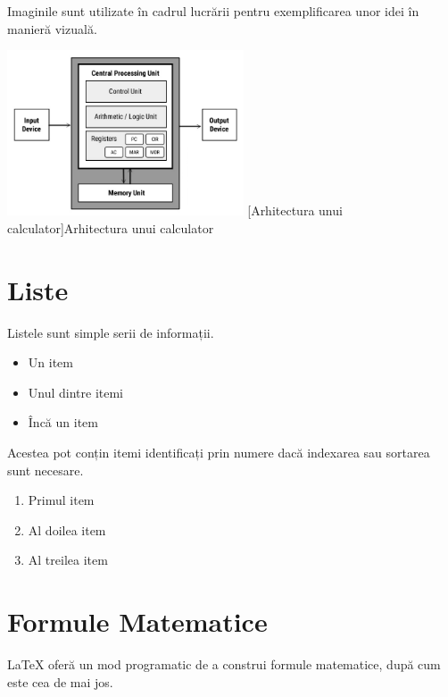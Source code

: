 \documentclass[../../main.tex]{subfiles}
\begin{document}
Imaginile sunt utilizate în cadrul lucrării pentru exemplificarea unor idei în manieră vizuală.

\begin{center}
    \includegraphics[width=7cm]{components/images/architecture.jpg}
    \label{fig:architecture}
    \captionsetup{justification=centering,margin=1cm}
    [Arhitectura unui calculator]{Arhitectura unui calculator\footnotemark}
\end{center}
\vspace{0.3cm}


\section{Liste}

Listele sunt simple serii de informații.

\begin{itemize}
    \item Un item
    \item Unul dintre itemi
    \item Încă un item
\end{itemize}

Acestea pot conțin itemi identificați prin numere dacă indexarea sau sortarea sunt necesare.

\begin{enumerate}
    \item Primul item
    \item Al doilea item
    \item Al treilea item
\end{enumerate}

\section{Formule Matematice}

\LaTeX{} oferă un mod programatic de a construi formule matematice, după cum este cea de mai jos.
\end{document}
